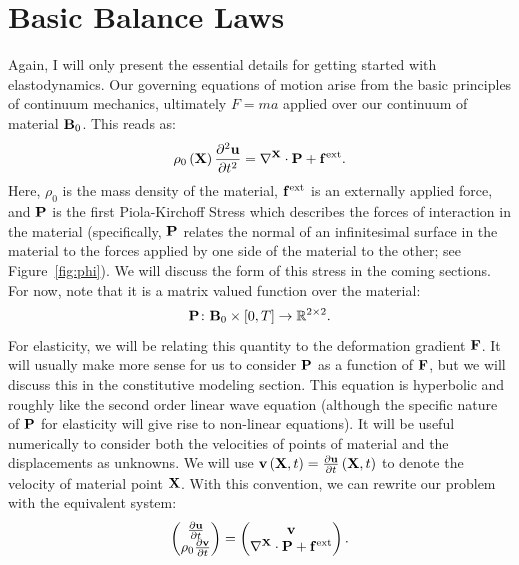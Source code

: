 \section*{Basic Balance Laws}

Again, I will only present the essential details for getting started with elastodynamics. Our governing equations of motion arise from the basic principles of continuum mechanics, ultimately $F = ma$ applied over our continuum of material $\mathbf{B}_0$. This reads as:
\begin{equation*}
\rho_0 \left( \mathbf{X} \right) \frac{\partial^2 \mathbf{u}}{\partial t^2} = \nabla^{\mathbf{X}} \cdot \mathbf{P} + \mathbf{f}^{\text{ext}}.
\end{equation*}
Here, $\rho_0$ is the mass density of the material, $\mathbf{f}^\text{ext}$ is an externally applied force, and $\mathbf{P}$ is the first Piola-Kirchoff Stress which describes the forces of interaction in the material (specifically, $\mathbf{P}$ relates the normal of an infinitesimal surface in the material to the forces applied by one side of the material to the other; see Figure~\ref{fig:phi}). We will discuss the form of this stress in the coming sections. For now, note that it is a matrix valued function over the material:
\begin{equation*}
\mathbf{P} \colon \mathbf{B}_0 \times [0,T] \to \mathbb{R}^{2\times2}.
\end{equation*}
For elasticity, we will be relating this quantity to the deformation gradient $\mathbf{F}$. It will usually make more sense for us to consider $\mathbf{P}$ as a function of $\mathbf{F}$, but we will discuss this in the constitutive modeling section. This equation is hyperbolic and roughly like the second order linear wave equation (although the specific nature of $\mathbf{P}$ for elasticity will give rise to non-linear equations). It will be useful numerically to consider both the velocities of points of material and the displacements as unknowns. We will use $\mathbf{v} \left( \mathbf{X}, t \right) = \frac{\partial\mathbf{u}}{\partial t} \left( \mathbf{X}, t \right)$ to denote the velocity of material point $\mathbf{X}$. With this convention, we can rewrite our problem with the equivalent system:
\begin{equation*}
\begin{pmatrix}
\frac{\partial\mathbf{u}}{\partial t} \\
\rho_0 \frac{\partial\mathbf{v}}{\partial t}
\end{pmatrix}
= \begin{pmatrix}
\mathbf{v} \\
\nabla^{\mathbf{X}} \cdot \mathbf{P} + \mathbf{f}^{\text{ext}}
\end{pmatrix}.
\end{equation*}

